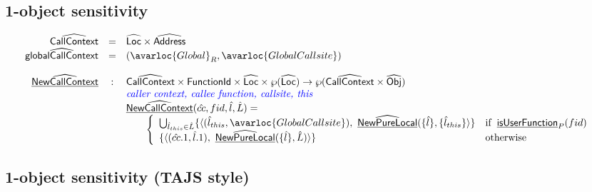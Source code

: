 \subsection{1-object sensitivity}

\[
\begin{array}{rcl}
\abs{CallContext} & = & \aLoc \times \abs{Address} \\
\abs{globalCallContext} & = & (\avarloc{Global}_R, \avarloc{GlobalCallsite}) \\
\\

\ahf{NewCallContext} & : & \abs{CallContext} \times \SF{FunctionId} \times \abs{Loc} \times \powerset{\abs{Loc}} \rightarrow \powerset{\abs{CallContext} \times \abs{Obj}} \\
& & \comment{\inblue caller context, callee function, callsite, this}  \\
& & \ahf{NewCallContext}(\hat{cc}, fid, \hat{l}, \hat{L}) = \\
& & \quad\quad \left\{
       \begin{array}{ll}
         \bigcup_{\hat{l}_{this} \in \hat{L}} 
         \{ \langle (\hat{l}_{this}, \avarloc{GlobalCallsite}), ~ \ahf{NewPureLocal}(\{\hat{l}\}, \{ \hat{l}_{this} \} \rangle \} & \ifc{\chf{isUserFunction}_P(fid)} \\
         \{ \langle (\hat{cc}.1, \hat{l}.1), ~ \ahf{NewPureLocal}(\{\hat{l}\}, \hat{L}) \rangle \} & \owc \\
       \end{array}
     \right.\\
\end{array}
\]


\subsection{1-object sensitivity (TAJS style)}

